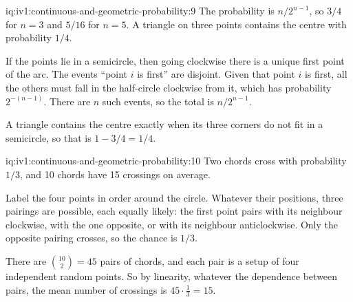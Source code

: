 \begin{solution}{iq:iv1:continuous-and-geometric-probability:9}
The probability is $n/2^{n - 1}$, so $3/4$ for $n = 3$ and $5/16$ for $n = 5$. A triangle on three points contains the centre with probability $1/4$.

If the points lie in a semicircle, then going clockwise there is a unique first point of the arc. The events ``point $i$ is first'' are disjoint. Given that point $i$ is first, all the others must fall in the half-circle clockwise from it, which has probability $2^{-(n - 1)}$. There are $n$ such events, so the total is $n/2^{n - 1}$.

A triangle contains the centre exactly when its three corners do not fit in a semicircle, so that is $1 - 3/4 = 1/4$.

\end{solution}

\begin{solution}{iq:iv1:continuous-and-geometric-probability:10}
Two chords cross with probability $1/3$, and 10 chords have 15 crossings on average.

Label the four points in order around the circle. Whatever their positions, three pairings are possible, each equally likely: the first point pairs with its neighbour clockwise, with the one opposite, or with its neighbour anticlockwise. Only the opposite pairing crosses, so the chance is $1/3$.

There are $\binom{10}{2} = 45$ pairs of chords, and each pair is a setup of four independent random points. So by linearity, whatever the dependence between pairs, the mean number of crossings is $45 \cdot \tfrac13 = 15$.

\end{solution}

